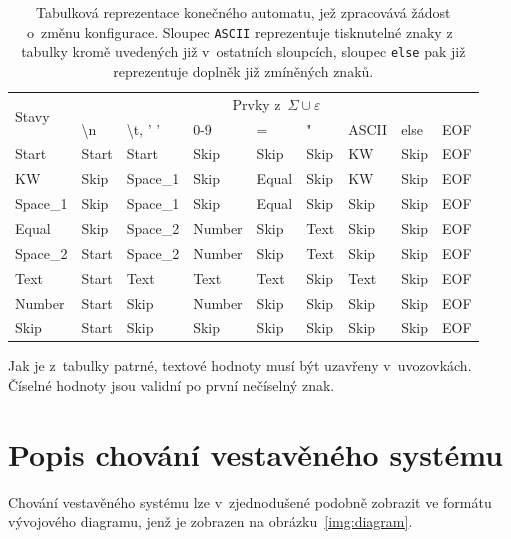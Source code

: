             \begin{table}[h]\centering
                \begin{tabular}{@{}lllllllll@{}}
                    \toprule
                    \multirow{2}{*}{Stavy}&   \multicolumn{8}{c}{Prvky z~$\Sigma\cup\varepsilon$}\\
                    \cmidrule{2-9}
                    & \textbackslash n & \textbackslash t, ' ' & 0-9 & =    & "         & ASCII     & else &EOF\\
                    \midrule
                    Start   & Start     & Start     & Skip      & Skip      & Skip      & KW        & Skip &EOF\\
                    KW      & Skip      & Space\_1  & Skip      & Equal     & Skip      & KW        & Skip &EOF\\
                    Space\_1& Skip      & Space\_1  & Skip      & Equal     & Skip      & Skip      & Skip &EOF\\
                    Equal   & Skip      & Space\_2  & Number    & Skip      & Text      & Skip      & Skip &EOF\\    
                    Space\_2& Start     & Space\_2  & Number    & Skip      & Text      & Skip      & Skip &EOF\\
                    Text    & Start     & Text      & Text      & Text      & Skip      & Text      & Skip &EOF\\
                    Number  & Start     & Skip      & Number    & Skip      & Skip      & Skip      & Skip &EOF\\
                    Skip    & Start     & Skip      & Skip      & Skip      & Skip      & Skip      & Skip &EOF\\
                    \bottomrule
                \end{tabular}
                \caption{Tabulková reprezentace konečného automatu, jež zpracovává žádost o~změnu konfigurace. Sloupec \texttt{ASCII} reprezentuje tisknutelné znaky z~ tabulky kromě uvedených již v~ostatních sloupcích, sloupec \texttt{else} pak již reprezentuje doplněk již zmíněných znaků.}
                \label{table:ka}
            \end{table}

            Jak je z~tabulky patrné, textové hodnoty musí být uzavřeny v~uvozovkách. Číselné hodnoty jsou validní po první nečíselný znak. 

    \section{Popis chování vestavěného systému}
        Chování vestavěného systému lze v~zjednodušené podobně zobrazit ve formátu vývojového diagramu, jenž je zobrazen na obrázku~\ref{img:diagram}.

